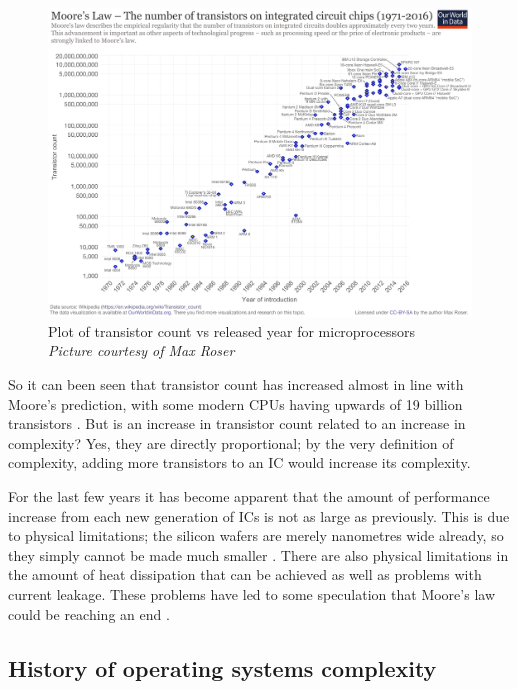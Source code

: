 \begin{figure} \begin{center}
\includegraphics[width=1\linewidth]{pics/moore_law} 
\end{center} 
\caption{Plot of transistor count vs released year for microprocessors\\ \textit{\small{Picture courtesy of Max Roser}}}
\label{tran_count_over_time}
\end{figure}

So it can been seen that transistor count has increased almost in line with Moore's prediction, with some modern CPUs having upwards of 19 billion transistors 
\cite{RN80}. But is an increase in transistor count related to an increase in complexity? Yes, they are directly proportional; by the very definition of complexity, adding more transistors to an IC would increase its complexity. 

For the last few years it has become apparent that the amount of performance increase from each new generation of ICs is not as large as previously. This is due to physical limitations; the silicon wafers are merely nanometres wide already, so they simply cannot be made much smaller
\cite{RN141}. There are also physical limitations in the amount of heat dissipation that can be achieved as well as problems with current leakage. These problems have led to some speculation that Moore's law could be reaching an end 
\cite{RN49}.

\subsection{History of operating systems complexity}

